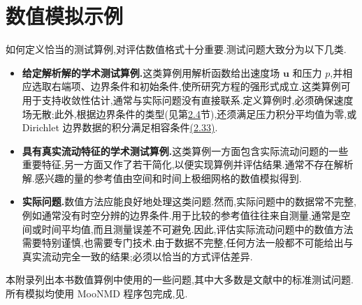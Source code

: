 \chapter{数值模拟示例}\label{chap:appendix-d}

\begin{note}[一般考虑]\label{note:appendix-d-1}
如何定义恰当的测试算例,对评估数值格式十分重要.测试问题大致分为以下几类.
\begin{itemize}
  \item \textbf{给定解析解的学术测试算例.}这类算例用解析函数给出速度场 $\bm u$ 和压力 $p$,并相应选取右端项、边界条件和初始条件,使所研究方程的强形式成立.这类算例可用于支持收敛性估计,通常与实际问题没有直接联系.定义算例时,必须确保速度场无散;此外,根据边界条件的类型(见第\hyperref[sec:initial-boundary]{2.4}节),还须满足压力积分平均值为零,或 Dirichlet 边界数据的积分满足相容条件\hyperref[eq:dirichlet-flux-compatibility]{(2.33)}.
  \item \textbf{具有真实流动特征的学术测试算例.}这类算例一方面包含实际流动问题的一些重要特征,另一方面又作了若干简化,以便实现算例并评估结果.通常不存在解析解.感兴趣的量的参考值由空间和时间上极细网格的数值模拟得到.
  \item \textbf{实际问题.}数值方法应能良好地处理这类问题.然而,实际问题中的数据常不完整,例如通常没有时空分辨的边界条件.用于比较的参考值往往来自测量,通常是空间或时间平均值,而且测量误差不可避免.因此,评估实际流动问题中的数值方法需要特别谨慎,也需要专门技术.由于数据不完整,任何方法一般都不可能给出与真实流动完全一致的结果;必须以恰当的方式评估差异.
\end{itemize}
本附录列出本书数值算例中使用的一些问题,其中大多数是文献中的标准测试问题.所有模拟均使用 MooNMD 程序包完成,见\textcite{JohnMatthies2004}.
\end{note}

